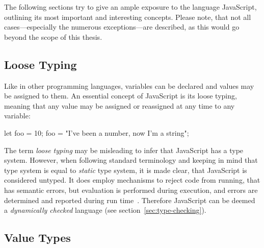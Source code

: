 The following sections try to give an ample exposure to the language JavaScript, outlining its most important and interesting concepts. Please note, that not all cases---especially the numerous exceptions---are described, as this would go beyond the scope of this thesis.

\subsection{Loose Typing}
\label{sec:untyped-loosely-typed}

Like in other programming languages, variables can be declared and values may be assigned to them. An essential concept of JavaScript is its loose typing, meaning that any value may be assigned or reassigned at any time to any variable:
\begin{JsCode}[numbers=none]
let foo = 10;
foo = "I've been a number, now I'm a string";
\end{JsCode}
The term \emph{loose typing} may be misleading to infer that JavaScript has a type system. However, when following standard terminology and keeping in mind that type system is equal to \emph{static} type system, it is made clear, that JavaScript is considered untyped. It does employ mechanisms to reject code from running, that has semantic errors, but evaluation is performed during execution, and errors are determined and reported during run time~\cite[p.~291]{ES2015Spec:Ecma:2015}. Therefore JavaScript can be deemed a \emph{dynamically checked} language (see section~\ref{sec:type-checking}).

\subsection{Value Types}
\label{sec:value-types}

